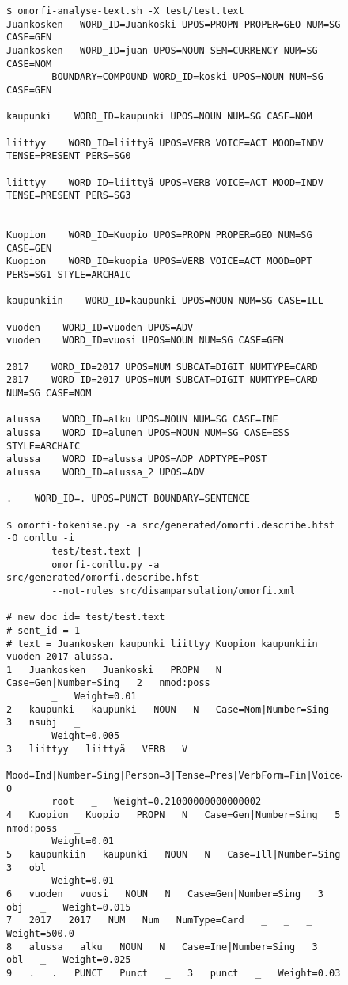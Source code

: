 \documentclass{flammie}
\begin{document}
\begin{figure}
    \begin{tiny}
        \begin{verbatim}$ omorfi-analyse-text.sh -X test/test.text
Juankosken   WORD_ID=Juankoski UPOS=PROPN PROPER=GEO NUM=SG CASE=GEN
Juankosken   WORD_ID=juan UPOS=NOUN SEM=CURRENCY NUM=SG CASE=NOM
        BOUNDARY=COMPOUND WORD_ID=koski UPOS=NOUN NUM=SG CASE=GEN

kaupunki    WORD_ID=kaupunki UPOS=NOUN NUM=SG CASE=NOM

liittyy    WORD_ID=liittyä UPOS=VERB VOICE=ACT MOOD=INDV TENSE=PRESENT PERS=SG0

liittyy    WORD_ID=liittyä UPOS=VERB VOICE=ACT MOOD=INDV TENSE=PRESENT PERS=SG3


Kuopion    WORD_ID=Kuopio UPOS=PROPN PROPER=GEO NUM=SG CASE=GEN
Kuopion    WORD_ID=kuopia UPOS=VERB VOICE=ACT MOOD=OPT PERS=SG1 STYLE=ARCHAIC

kaupunkiin    WORD_ID=kaupunki UPOS=NOUN NUM=SG CASE=ILL

vuoden    WORD_ID=vuoden UPOS=ADV
vuoden    WORD_ID=vuosi UPOS=NOUN NUM=SG CASE=GEN

2017    WORD_ID=2017 UPOS=NUM SUBCAT=DIGIT NUMTYPE=CARD
2017    WORD_ID=2017 UPOS=NUM SUBCAT=DIGIT NUMTYPE=CARD NUM=SG CASE=NOM

alussa    WORD_ID=alku UPOS=NOUN NUM=SG CASE=INE
alussa    WORD_ID=alunen UPOS=NOUN NUM=SG CASE=ESS STYLE=ARCHAIC
alussa    WORD_ID=alussa UPOS=ADP ADPTYPE=POST
alussa    WORD_ID=alussa_2 UPOS=ADV

.    WORD_ID=. UPOS=PUNCT BOUNDARY=SENTENCE

$ omorfi-tokenise.py -a src/generated/omorfi.describe.hfst -O conllu -i
        test/test.text |
        omorfi-conllu.py -a src/generated/omorfi.describe.hfst
        --not-rules src/disamparsulation/omorfi.xml

# new doc id= test/test.text
# sent_id = 1
# text = Juankosken kaupunki liittyy Kuopion kaupunkiin vuoden 2017 alussa.
1   Juankosken   Juankoski   PROPN   N   Case=Gen|Number=Sing   2   nmod:poss
        _   Weight=0.01
2   kaupunki   kaupunki   NOUN   N   Case=Nom|Number=Sing   3   nsubj   _
        Weight=0.005
3   liittyy   liittyä   VERB   V
        Mood=Ind|Number=Sing|Person=3|Tense=Pres|VerbForm=Fin|Voice=Act   0
        root   _   Weight=0.21000000000000002
4   Kuopion   Kuopio   PROPN   N   Case=Gen|Number=Sing   5   nmod:poss   _
        Weight=0.01
5   kaupunkiin   kaupunki   NOUN   N   Case=Ill|Number=Sing   3   obl   _
        Weight=0.01
6   vuoden   vuosi   NOUN   N   Case=Gen|Number=Sing   3   obj   _   Weight=0.015
7   2017   2017   NUM   Num   NumType=Card   _   _   _   Weight=500.0
8   alussa   alku   NOUN   N   Case=Ine|Number=Sing   3   obl   _   Weight=0.025
9   .   .   PUNCT   Punct   _   3   punct   _   Weight=0.03


\end{verbatim}
\end{tiny}
\end{figure}
\end{document}
